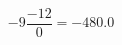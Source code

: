 \documentclass[preview]{standalone}
\begin{document}
\begin{align*}
-9 \dfrac{ -12 }{0}= -480.0
\end{align*}
\end{document}
